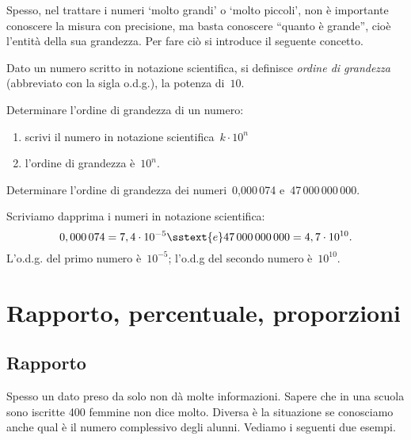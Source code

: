 Spesso, nel trattare i numeri `molto grandi' o `molto piccoli', non è 
importante conoscere la misura con precisione, ma basta conoscere 
``quanto è grande'', cioè l'entità della sua grandezza. 
Per fare ciò si introduce il seguente concetto.

\begin{definizione}{}{}
Dato un numero scritto in notazione scientifica, si definisce 
\emph{ordine di grandezza} (abbreviato con la sigla o.d.g.),
la potenza di~\(10\).
\end{definizione}

\begin{procedura}{}{}
Determinare l'ordine di grandezza di un numero:
\begin{enumerate}[noitemsep, label=(\alph*)]
\item scrivi il numero in notazione scientifica~\({k \cdot 10^n}\)
\item l'ordine di grandezza è~\(10^{n}\).
\end{enumerate}
\end{procedura}



 \begin{esempio}{}{}
Determinare l'ordine di grandezza dei numeri~0,000\,074 e~47\,000\,000\,000.

Scriviamo dapprima i numeri in notazione scientifica:
\[0,000\,074 = 7,4 \cdot 10^{-5} \sstext{ e } 
  47\,000\,000\,000 = 4,7 \cdot 10^{10}.\]
L'o.d.g. del primo numero è~\(10^{-5}\); \qquad 
l'o.d.g del secondo numero è~\(10^{10}\).
 \end{esempio}



\section{Rapporto, percentuale, proporzioni}
\label{sec:razionali_rapporto}

\subsection{Rapporto}

Spesso un dato preso da solo non dà molte informazioni. 
Sapere che in una 
scuola sono iscritte 400 femmine non dice molto. Diversa è la situazione se 
conosciamo anche qual è il numero complessivo degli alunni.
Vediamo i seguenti due esempi.

